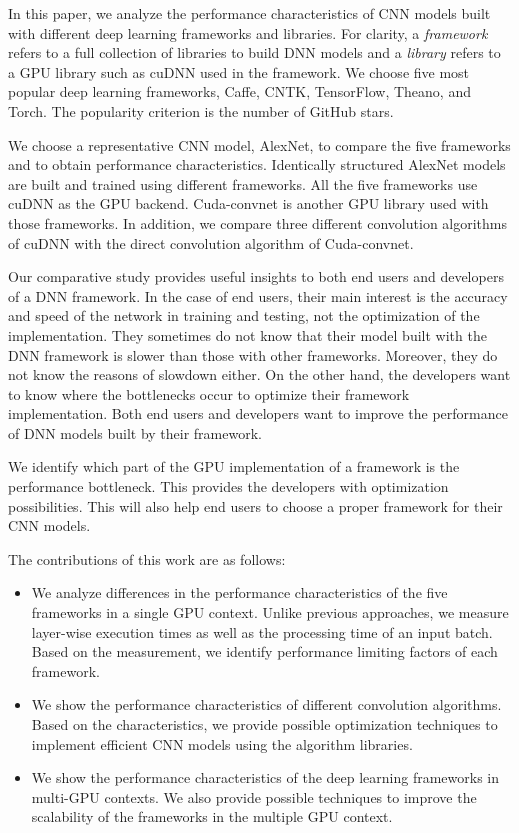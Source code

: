 In this paper, we analyze the performance characteristics of CNN models built with different deep learning frameworks and libraries. For clarity, a \textit{framework} refers to a full collection of libraries to build DNN models and a \textit{library} refers to a GPU library such as cuDNN used in the framework. We choose five most popular deep learning frameworks, Caffe\cite{jia2014caffe}, CNTK\cite{cntk}, TensorFlow\cite{tensorflow2015-whitepaper}, Theano\cite{DBLP:journals/corr/Al-RfouAAa16}, and Torch\cite{torch}. The popularity criterion is the number of GitHub stars\cite{github}.

We choose a representative CNN model, AlexNet\cite{krizhevsky2012imagenet}, to compare the five frameworks and to obtain performance characteristics. Identically structured AlexNet models are built and trained using different frameworks. All the five frameworks use cuDNN as the GPU backend. Cuda-convnet\cite{cuda-convnet} is another GPU library used with those frameworks. In addition, we compare three different convolution algorithms of cuDNN with the direct convolution algorithm of Cuda-convnet.

Our comparative study provides useful insights to both end users and developers of a DNN framework. In the case of end users, their main interest is the accuracy and speed of the network in training and testing, not the optimization of the implementation. They sometimes do not know that their model built with the DNN framework is slower than those with other frameworks. Moreover, they do not know the reasons of slowdown either. On the other hand, the developers want to know where the bottlenecks occur to optimize their framework implementation. Both end users and developers want to improve the performance of DNN models built by their framework.

We identify which part of the GPU implementation of a framework is the performance bottleneck. This provides the developers with optimization possibilities. This will also help end users to choose a proper framework for their CNN models. 

The contributions of this work are as follows:
\begin{itemize}
\item We analyze differences in the performance characteristics of the five frameworks in a single GPU context. Unlike previous approaches, we measure layer-wise execution times as well as the processing time of an input batch. Based on the measurement, we identify performance limiting factors of each framework. 

\item We show the performance characteristics of different convolution algorithms. Based on the characteristics, we provide possible optimization techniques to implement efficient CNN models using the algorithm libraries.

\item We show the performance characteristics of the deep learning frameworks in multi-GPU contexts. We also provide possible techniques to improve the scalability of the frameworks in the multiple GPU context.
\end{itemize}


